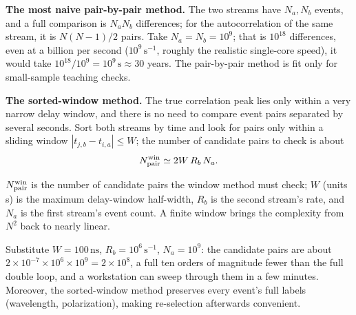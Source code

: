 \textbf{The most naive pair-by-pair method.} The two streams have $N_a,N_b$ events, and a full comparison is $N_aN_b$ differences; for the autocorrelation of the same stream, it is $N(N-1)/2$ pairs. Take $N_a=N_b=10^{9}$; that is $10^{18}$ differences, even at a billion per second ($10^{9}\,\mathrm{s^{-1}}$, roughly the realistic single-core speed), it would take $10^{18}/10^{9}=10^{9}\,\mathrm s\approx30$ years. The pair-by-pair method is fit only for small-sample teaching checks.

\textbf{The sorted-window method.} The true correlation peak lies only within a very narrow delay window, and there is no need to compare event pairs separated by several seconds. Sort both streams by time and look for pairs only within a sliding window $|t_{j,b}-t_{i,a}|\le W$; the number of candidate pairs to check is about
\begin{equation}
  N_{\rm pair}^{\rm win}\simeq 2W\,R_b\,N_a .
  \label{eq:e14-window}
\end{equation}
\begin{formulaexplain}
$N_{\rm pair}^{\rm win}$ is the number of candidate pairs the window method must check; $W$ (units s) is the maximum delay-window half-width, $R_b$ is the second stream's rate, and $N_a$ is the first stream's event count. A finite window brings the complexity from $N^2$ back to nearly linear.
\end{formulaexplain}
Substitute $W=100\,\mathrm{ns}$, $R_b=10^{6}\,\mathrm{s^{-1}}$, $N_a=10^{9}$: the candidate pairs are about $2\times10^{-7}\times10^{6}\times10^{9}=2\times10^{8}$, a full ten orders of magnitude fewer than the full double loop, and a workstation can sweep through them in a few minutes. Moreover, the sorted-window method preserves every event's full labels (wavelength, polarization), making re-selection afterwards convenient.

